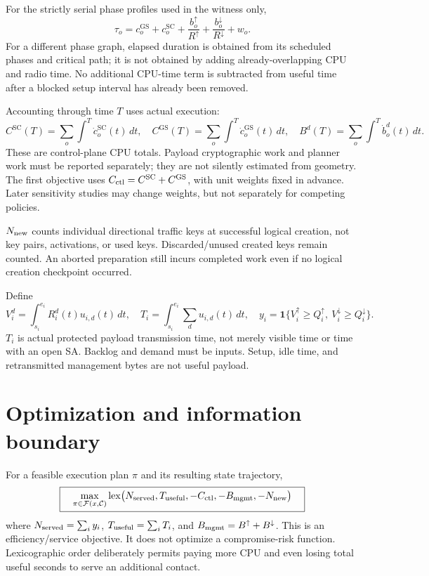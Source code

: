 \documentclass[11pt,a4paper]{article}
\newcommand{\SC}{\mathrm{SC}}
\newcommand{\GS}{\mathrm{GS}}
\begin{document}
For the strictly serial phase profiles used in the witness only,
\[
 \tau_o=c_o^\GS+c_o^\SC+
       \frac{b_o^\uparrow}{R^\uparrow}+
       \frac{b_o^\downarrow}{R^\downarrow}+w_o .
\]
For a different phase graph, elapsed duration is obtained from its scheduled phases and critical path; it is not obtained by adding already-overlapping CPU and radio time. No additional CPU-time term is subtracted from useful time after a blocked setup interval has already been removed.

Accounting through time $T$ uses actual execution:
\[
 C^\SC(T)=\sum_o\int^{T}\dot c_o^\SC(t)\,dt,\quad
 C^\GS(T)=\sum_o\int^{T}\dot c_o^\GS(t)\,dt,\quad
 B^d(T)=\sum_o\int^{T}\dot b_o^d(t)\,dt.
\]
These are control-plane CPU totals. Payload cryptographic work and planner work must be reported separately; they are not silently estimated from geometry. The first objective uses $C_{\rm ctl}=C^\SC+C^\GS$, with unit weights fixed in advance. Later sensitivity studies may change weights, but not separately for competing policies.

$N_{\rm new}$ counts individual directional traffic keys at successful logical creation, not key pairs, activations, or used keys. Discarded/unused created keys remain counted. An aborted preparation still incurs completed work even if no logical creation checkpoint occurred.

Define
\[
 V_i^d=\int_{s_i}^{e_i}R_i^d(t)u_{i,d}(t)\,dt,\quad
 T_i=\int_{s_i}^{e_i}\sum_d u_{i,d}(t)\,dt,\quad
 y_i=\mathbf1\{V_i^\uparrow\geq Q_i^\uparrow,\ V_i^\downarrow\geq Q_i^\downarrow\}.
\]
$T_i$ is actual protected payload transmission time, not merely visible time or time with an open SA. Backlog and demand must be inputs. Setup, idle time, and retransmitted management bytes are not useful payload.

\section{Optimization and information boundary}
For a feasible execution plan $\pi$ and its resulting state trajectory,
\[
 \boxed{\quad
 \max_{\pi\in\mathcal F(x,\mathcal C)}
       \operatorname{lex}\bigl(
       N_{\rm served},T_{\rm useful},-C_{\rm ctl},-B_{\rm mgmt},-N_{\rm new}\bigr)
       \quad}
\]
where $N_{\rm served}=\sum_i y_i$, $T_{\rm useful}=\sum_iT_i$, and
$B_{\rm mgmt}=B^\uparrow+B^\downarrow$.
This is an efficiency/service objective. It does not optimize a compromise-risk function. Lexicographic order deliberately permits paying more CPU and even losing total useful seconds to serve an additional contact.
\end{document}
